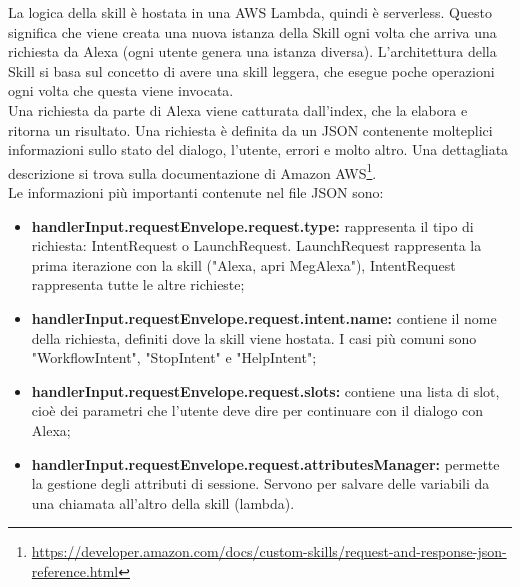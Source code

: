 La logica della skill è hostata in una AWS Lambda, quindi è serverless. Questo significa che viene creata una nuova istanza della Skill ogni volta che arriva una richiesta da Alexa (ogni utente genera una istanza diversa). L'architettura della Skill si basa sul concetto di avere una skill leggera, che esegue poche operazioni ogni volta che questa viene invocata.\\
Una richiesta da parte di Alexa viene catturata dall'index, che la elabora e ritorna un risultato. Una richiesta è definita da un JSON contenente molteplici informazioni sullo stato del dialogo, l'utente, errori e molto altro. Una dettagliata descrizione si trova sulla documentazione di Amazon AWS\footnote{\url{https://developer.amazon.com/docs/custom-skills/request-and-response-json-reference.html}}.\\
Le informazioni più importanti contenute nel file JSON sono:\label{paramsSkill}
\begin{itemize}
    \item \textbf{handlerInput.requestEnvelope.request.type:} rappresenta il tipo di richiesta: IntentRequest o LaunchRequest. LaunchRequest rappresenta la prima iterazione con la skill ("Alexa, apri MegAlexa"), IntentRequest rappresenta tutte le altre richieste;
    \item \textbf{handlerInput.requestEnvelope.request.intent.name:} contiene il nome della richiesta, definiti dove la skill viene hostata. I casi più comuni sono "WorkflowIntent", "StopIntent" e "HelpIntent";
    \item \textbf{handlerInput.requestEnvelope.request.slots:} contiene una lista di slot, cioè dei parametri che l'utente deve dire per continuare con il dialogo con Alexa;
    \item \textbf{handlerInput.requestEnvelope.request.attributesManager:} permette la gestione degli attributi di sessione. Servono per salvare delle variabili da una chiamata all'altro della skill (lambda).
\end{itemize}

